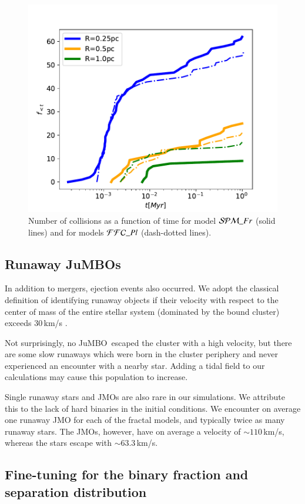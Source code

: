 \documentclass[submission,phys]{lib/SciPost}
\newcommand{\jumbo}{\mbox{JuMBO}}
\newcommand{\jumbos}{\mbox{JuMBOs}}
\begin{document}
\begin{figure}
\centering
    \includegraphics[width=0.75\columnwidth]{figures/fig_collision_evolution_ISF_Fr.pdf
    }
        \caption{Number of collisions as a function of time for model
          ${\cal SPM}\_Fr$ (solid lines) and for models ${\cal
            FFC}\_Pl$ (dash-dotted lines).}
         \label{Fig:collision_evolution_ISF_Fr}
\end{figure}

\subsection{Runaway \jumbos}

In addition to mergers, ejection events also occurred.  We adopt the
classical definition of identifying runaway objects if their velocity
with respect to the center of mass of the entire stellar system
(dominated by the bound cluster) exceeds 30\,km/s
\cite{1961BAN....15..265B}.

Not surprisingly, no \jumbo\, escaped the cluster with a high
velocity, but there are some slow runaways which were born in the
cluster periphery and never experienced an encounter with a nearby
star. Adding a tidal field to our calculations may cause this
population to increase.

Single runaway stars and JMOs are also rare in our simulations. We
attribute this to the lack of hard binaries in the initial
conditions.  We encounter on average one runaway JMO for each of the
fractal models, and typically twice as many runaway stars.  The JMOs,
however, have on average a velocity of $\sim 110$\,km/s, whereas the stars
escape with $\sim 63.3$\,km/s.

\subsection{Fine-tuning for the binary fraction and separation distribution}\label{sect:finetuningbinary_fraction}
\end{document}
